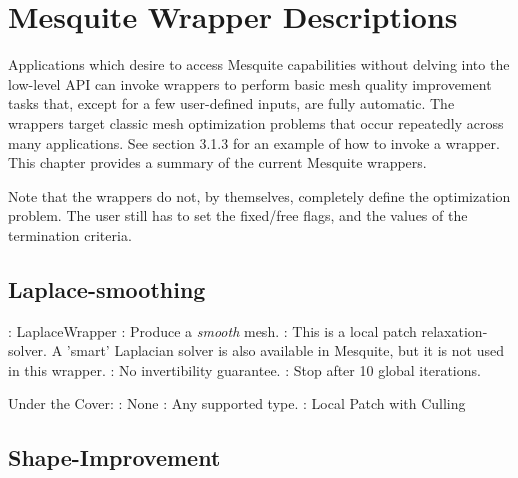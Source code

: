 \chapter{Mesquite Wrapper Descriptions}
\label{sec:wrappers}

Applications which desire to access Mesquite capabilities without delving 
into the low-level API can invoke wrappers to perform basic mesh quality 
improvement tasks that, except for a few user-defined inputs, are fully 
automatic. The wrappers target classic mesh optimization problems that occur 
repeatedly across many applications. See section 3.1.3 for an example of how
to invoke a wrapper. 
This chapter provides a summary of the current Mesquite wrappers. \newline

\noindent Note that the wrappers do not, by themselves, completely define
the optimization problem.  The user still has to set the fixed/free flags,
and the values of the termination criteria.  \newline

\section{Laplace-smoothing} \label{sec:LaplaceWrapper}

: LaplaceWrapper \newline
{}: Produce a {\it smooth} mesh. \newline
{}: This is a local patch relaxation-solver. A 'smart' 
Laplacian solver is also available in Mesquite, but it is not used in this 
wrapper.  \newline
{}: No invertibility guarantee. \newline 
{}: Stop after 10 global iterations. \newline \newline

\noindent Under the Cover: \newline
{}: None \newline
{}: Any supported type. \newline
{}: Local Patch with Culling \newline



\section{Shape-Improvement} \label{sec:ShapeImprover}

